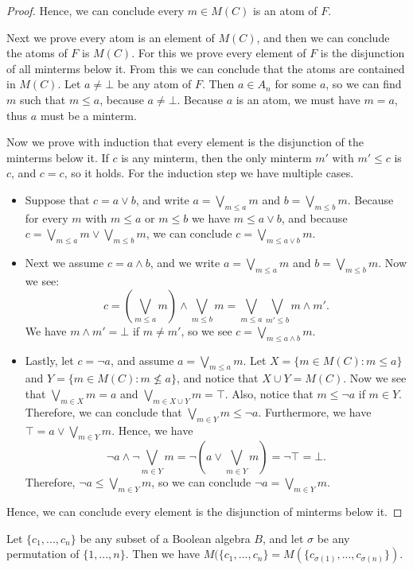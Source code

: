 \begin{proof}
Hence, we can conclude every $m \in M(C)$ is an atom of $F$.

Next we prove every atom is an element of $M(C)$, and then we can conclude the atoms of $F$ is $M(C)$. For this we prove every element of $F$ is the disjunction of all minterms below it. From this we can conclude that the atoms are contained in $M(C)$. Let $a \neq \bot$ be any atom of $F$. Then $a \in A_n$ for some $a$, so we can find $m$ such that $m \leq a$, because $a \neq \bot$. Because $a$ is an atom, we must have $m = a$, thus $a$ must be a minterm.

Now we prove with induction that every element is the disjunction of the minterms below it. If $c$ is any minterm, then the only minterm $m'$ with $m' \leq c$ is $c$, and $c = c$, so it holds. For the induction step we have multiple cases.

\begin{itemize}
	\item Suppose that $c = a \lor b$, and write $a = \bigvee_{m \leq a} m$ and $b = \bigvee_{m \leq b} m$. Because for every $m$ with $m \leq a$ or $m \leq b$ we have $m \leq a \lor b$, and because $c = \bigvee_{m \leq a} m \vee \bigvee_{m \leq b} m$, we can conclude $c = \bigvee_{m \leq a \lor b} m$. 
	\item Next we assume $c = a \land b$, and we write $a = \bigvee_{m \leq a} m$ and $b = \bigvee_{m \leq b} m$. Now we see:
	\[c = (\bigvee_{m \leq a} m) \land \bigvee_{m \leq b} m = \bigvee_{m \leq a} \bigvee_{m' \leq b} m \land m'.\]
	We have $m \land m' = \bot$ if $m \neq m'$, so we see $c = \bigvee_{m \leq a \land b} m$.
	\item Lastly, let $c = \neg a$, and assume $a = \bigvee_{m \leq a} m$. Let $X = \{m \in M(C) : m \leq a\}$ and $Y = \{m \in M(C) : m \not \leq a\}$, and notice that $X \cup Y = M(C)$. Now we see that $\bigvee_{m \in X} m = a$ and $\bigvee_{m \in X \cup Y} m = \top$. Also, notice that $m \leq \neg a$ if $m \in Y$. Therefore, we can conclude that $\bigvee_{m \in Y} m \leq \neg a$. Furthermore, we have $\top = a \lor \bigvee_{m \in Y} m$. Hence, we have
	\[\neg a \land \neg \bigvee_{m \in Y} m = \neg (a \lor \bigvee_{m \in Y} m) = \neg \top = \bot.\]
	Therefore, $\neg a \leq \bigvee_{m \in Y} m$, so we can conclude $\neg a = \bigvee_{m \in Y} m$.
\end{itemize}
Hence, we can conclude every element is the disjunction of minterms below it.
\end{proof}

\begin{proposition}
Let $\{c_1, ..., c_n\}$ be any subset of a Boolean algebra $B$, and let $\sigma$ be any permutation of $\{1, ..., n\}$. Then we have $M(\{c_1, ..., c_n\} = M(\{c_{\sigma(1)}, ..., c_{\sigma(n)}\})$.
\end{proposition}

